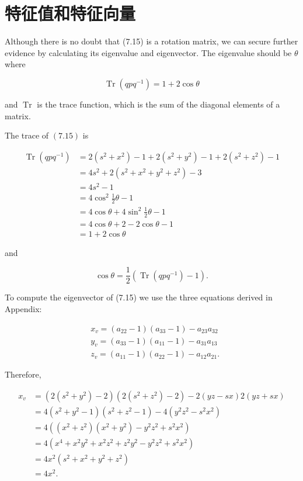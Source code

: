 \section{特征值和特征向量}
Although there is no doubt that (7.15) is a rotation matrix, we can secure further evidence by calculating its eigenvalue and eigenvector. The eigenvalue should be $\theta$ where

$$
\operatorname{Tr}\left(q p q^{-1}\right)=1+2 \cos \theta
$$

and $\operatorname{Tr}$ is the trace function, which is the sum of the diagonal elements of a matrix.

The trace of $(7.15)$ is

$$
\begin{aligned}
\operatorname{Tr}\left(q p q^{-1}\right) & =2\left(s^{2}+x^{2}\right)-1+2\left(s^{2}+y^{2}\right)-1+2\left(s^{2}+z^{2}\right)-1 \\
& =4 s^{2}+2\left(s^{2}+x^{2}+y^{2}+z^{2}\right)-3 \\
& =4 s^{2}-1 \\
& =4 \cos ^{2} \frac{1}{2} \theta-1 \\
& =4 \cos \theta+4 \sin ^{2} \frac{1}{2} \theta-1 \\
& =4 \cos \theta+2-2 \cos \theta-1 \\
& =1+2 \cos \theta
\end{aligned}
$$

and

$$
\cos \theta=\frac{1}{2}\left(\operatorname{Tr}\left(q p q^{-1}\right)-1\right) .
$$

To compute the eigenvector of (7.15) we use the three equations derived in Appendix:

$$
\begin{aligned}
& x_{v}=\left(a_{22}-1\right)\left(a_{33}-1\right)-a_{23} a_{32} \\
& y_{v}=\left(a_{33}-1\right)\left(a_{11}-1\right)-a_{31} a_{13} \\
& z_{v}=\left(a_{11}-1\right)\left(a_{22}-1\right)-a_{12} a_{21} .
\end{aligned}
$$

Therefore,

$$
\begin{aligned}
x_{v} & =\left(2\left(s^{2}+y^{2}\right)-2\right)\left(2\left(s^{2}+z^{2}\right)-2\right)-2(y z-s x) 2(y z+s x) \\
& =4\left(s^{2}+y^{2}-1\right)\left(s^{2}+z^{2}-1\right)-4\left(y^{2} z^{2}-s^{2} x^{2}\right) \\
& =4\left(\left(x^{2}+z^{2}\right)\left(x^{2}+y^{2}\right)-y^{2} z^{2}+s^{2} x^{2}\right) \\
& =4\left(x^{4}+x^{2} y^{2}+x^{2} z^{2}+z^{2} y^{2}-y^{2} z^{2}+s^{2} x^{2}\right) \\
& =4 x^{2}\left(s^{2}+x^{2}+y^{2}+z^{2}\right) \\
& =4 x^{2} .
\end{aligned}
$$

